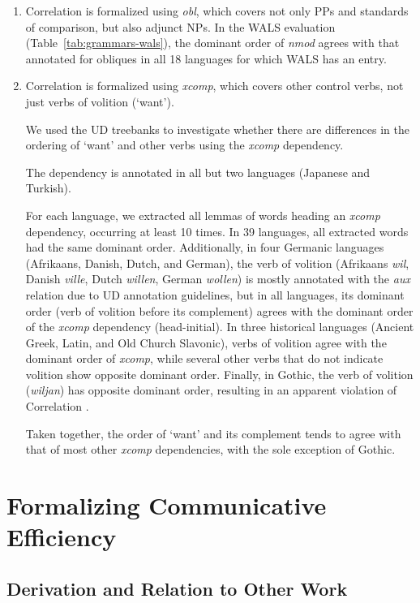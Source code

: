 \documentclass[10pt,twoside,lineno]{article}
\begin{document}
\begin{enumerate}
\item Correlation {} is formalized using \emph{obl}, which covers not only PPs and standards of comparison, but also adjunct NPs.
In the WALS evaluation (Table~\ref{tab:grammars-wals}), the dominant order of \emph{nmod} agrees with that annotated for obliques in all 18 languages for which WALS has an entry.
	
\item Correlation {} is formalized using \emph{xcomp}, which covers other control verbs, not just verbs of volition (`want').

We used the UD treebanks to investigate whether there are differences in the ordering of `want' and other verbs using the \emph{xcomp} dependency.

The dependency is annotated in all but two languages (Japanese and Turkish).

For each language, we extracted all lemmas of words heading an \emph{xcomp} dependency, occurring at least 10 times.
In 39 languages, all extracted words had the same dominant order.
Additionally, in four Germanic languages (Afrikaans, Danish, Dutch, and German), the verb of volition (Afrikaans \emph{wil}, Danish \emph{ville}, Dutch \emph{willen}, German \emph{wollen}) is mostly annotated with the \emph{aux} relation due to UD annotation guidelines, but in all languages, its dominant order (verb of volition before its complement) agrees with the dominant order of the \emph{xcomp} dependency (head-initial).
In three historical languages (Ancient Greek, Latin, and Old Church Slavonic), verbs of volition agree with the dominant order of \emph{xcomp}, while several other verbs that do not indicate volition show opposite dominant order.
Finally, in Gothic, the verb of volition (\emph{wiljan}) has opposite dominant order, resulting in an apparent violation of Correlation .

Taken together, the order of `want' and its complement tends to agree with that of most other \emph{xcomp} dependencies, with the sole exception of Gothic.
\end{enumerate}

\section{Formalizing Communicative Efficiency}
\subsection{Derivation and Relation to Other Work}
\end{document}
